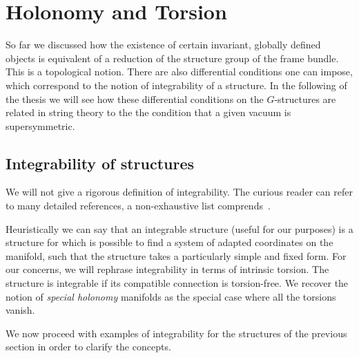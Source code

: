 \documentclass[debug]{phd}
\begin{document}
		\section{Holonomy and Torsion}
				So far we discussed how the existence of certain invariant, globally defined objects is equivalent of a reduction of the structure group of the frame bundle.
				This is a topological notion. There are also differential conditions one can impose, which correspond to the notion of integrability of a structure.
				In the following of the thesis we will see how these differential conditions on the $G$-structures are related in string theory to the the condition that a given
				vacuum is supersymmetric. 
			\subsection{Integrability of structures}
					We will not give a rigorous definition of integrability.
					The curious reader can refer to many detailed references, a non-exhaustive list comprends~\cite{int1, int2, int3}.
					
					Heuristically we can say that an integrable structure (useful for our purposes) is a structure for which is possible to find a system of adapted coordinates on the manifold, such that the structure takes a particularly simple and fixed form.
					For our concerns, we will rephrase integrability in terms of intrinsic torsion.
					The structure is integrable if its compatible connection is torsion-free.
					We recover the notion of \emph{special holonomy} manifolds as the special case where all the torsions vanish.
					
					We now proceed with examples of integrability for the structures of the previous section in order to clarify the concepts.
\end{document}

